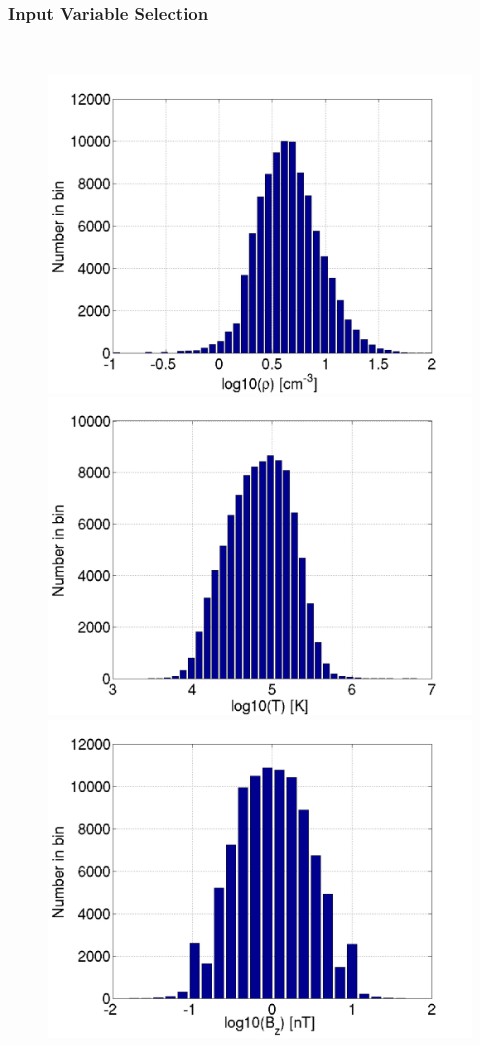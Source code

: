 \begin{frame}
	\frametitle{Input Variable Selection}\
	\begin{figure}
		\includegraphics[scale=0.17]{images/hist_N.png}\quad
		\includegraphics[scale=0.17]{images/hist_T.png}\\
		\includegraphics[scale=0.17]{images/hist_BZ.png}\quad

\end{figure}
\end{frame}
